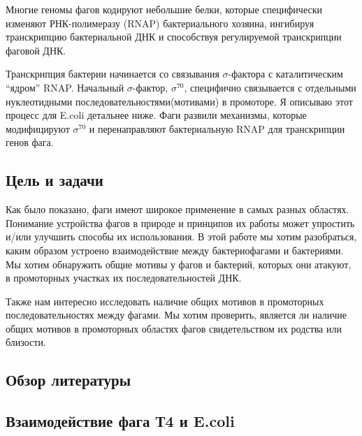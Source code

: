\documentclass[14pt]{extarticle}
\begin{document}
    \par{Многие геномы фагов кодируют небольшие белки, которые специфически изменяют РНК-полимеразу (RNAP)
    бактериального хозяина, ингибируя транскрипцию бактериальной ДНК и способствуя регулируемой транскрипции фаговой 
    ДНК. \cite{phagetrans}}    
    
    \par{Транскрипция бактерии начинается со связывания $\sigma$-фактора с каталитическим ``ядром'' RNAP. Начальный 
    $\sigma$-фактор, $\sigma^{70}$, специфично связывается с отдельными нуклеотидными последовательностями(мотивами) в 
    промоторе. Я описываю этот процесс для E.coli детальнее ниже. Фаги развили механизмы, которые модифицируют 
    $\sigma^{70}$ и перенаправляют бактериальную RNAP для транскрипции генов фага.}
    
\newpage
\begin{center}
\item \section{Цель и задачи} \label{sec:code}
\end{center}

    \par{Как было показано, фаги имеют широкое применение в самых разных областях. Понимание устройства фагов в природе 
    и принципов их работы может упростить и/или улучшить способы их использования. В этой работе мы хотим разобраться, 
    каким образом устроено взаимодействие между бактериофагами и бактериями. Мы хотим обнаружить общие мотивы 
    у фагов и бактерий, которых они атакуют, в промоторных участках их последовательностей ДНК.}
    \par{Также нам интересно исследовать наличие общих мотивов в промоторных последовательностях между фагами. Мы хотим проверить, является ли наличие общих мотивов в промоторных областях фагов свидетельством их родства или близости.}

\newpage
\begin{center}
\item \section{Обзор литературы} \label{sec:math}
\item \subsection{Взаимодействие фага Т4 и E.coli}
\end{center}
        
\end{document}
